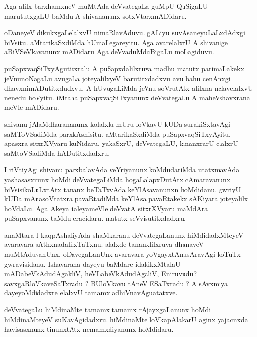 \documentclass{article}
\begin{document}
\begin{mn}%
Aga alilx barxhamxneV muMtAda deVvategaLa guMpU QuSigaLU marututxgaLU baMdu A shivananunx 
sotxVtarxmADidaru.
\end{mn}

\begin{mn}%
oDaneyeV dikukxgaLelalxvU nimaRlavAduvu. gALiyu suvAsaneyuLaLxdAdxgi biVsitu. 
aMtarikaSxdiMda hUmaLegareyitu. Aga avarelalxrU A shivanige aBiVSeVkavanunx mADidaru Aga 
deVvaduMduBigaLu moLagiduvu.
\end{mn}

\begin{mn}%
puSapxvaqSiTxyAgutitxralu A puSapxdalilxruva madhu matutx parimaLakekx jeVnunoNagaLu avugaLa 
joteyalilxyeV barutitxdadxvu avu bahu cenAnxgi dhavxnimADutitxdudxvu. A hUvugaLiMda jeVnu 
soVrutAtx alilxna nelavelalxvU nenedu hoVyitu. iMtaha puSapxvaqSiTxyanunx deVvategaLu A 
maheVshavxrana meVle mADidaru.
\end{mn}

\begin{mn}%
shivanu jAlaMdharananunx kolalxlu mUru loVkavU kUDa surakiSxtavAgi saMToVSadiMda 
parxkAshisitu. aMtarikaSxdiMda puSapxvaqSiTxyAyitu. apasxra sitxrXVyaru kuNidaru. yakaSxrU, 
deVvategaLU, kinanxrarU elalxrU saMtoVSadiMda hADutitxdadxru.
\end{mn}

\begin{mn}%
I riVtiyAgi shivanu parxbalavAda veYriyanunx koMdudariMda utatxmavAda yashasasxnunx hoMdi 
deVvategaLiMda hogaLalapxDutAtx cAmaravanunx biVsisikoLuLxtAtx tananx beTaTxvAda 
keYlAsavanunxn hoMdidanu. gwriyU kUDa mAnasoVtatxra pavaRtadiMda keYlAsa pavaRtakekx 
sAKiyara joteyalilx hoVdaLu. Aga Akeya taleyameVle deVvatA sitxrXVyaru maMdAra puSapxvanunx 
taMdu eracidaru. matutx seVvisutitxdadxru.
\end{mn}

\begin{mn}%
anaMtara I kaqpAshaliyAda shaMkaranu deVvategaLanunx hiMdidadxMteyeV avaravara 
sAthxnadalilxTaTxnu. alalxde tananxlilxruva dhanaveV muMtAduvanUnx. oDavegaLanUnx avaravara 
yoVgayxtAnusAravAgi koTuTx gwravisidanu. Ishavarana dayeyu baMdare idakikxMtalaU 
mADabeVkAdudAgakliV, heVLabeVkAdudAgaliV, Eniruvudu? savxgaRloVkaveSaTxradu ? BUloVkavu 
tAneV ESaTxradu ? A sAvxmiya dayeyoMdidadxre elalxvU tamamx adhiVnavAguatatxve.
\end{mn}

\begin{mn}%
deVvategaLu hiMdinaMte tamamx tamamx rAjayxgaLanunx hoMdi hiMdinaMteyeV suKavAgidadxru. 
hiMdinaMte loVkapAlakarU aginx yajacnxda havisasxnunx tinunxtAtx nemamxdiyanunx hoMdidaru.
\end{mn}
\end{document}
